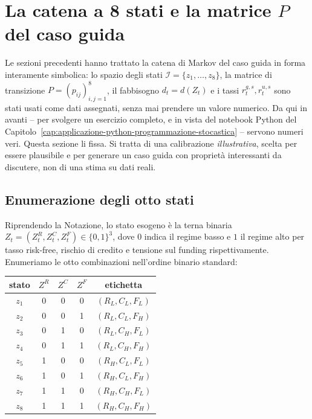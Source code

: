 \section{La catena a 8 stati e la matrice $P$ del caso guida}
\label{sec:cap15-catena-otto-stati}

Le sezioni precedenti hanno trattato la catena di Markov del caso guida
in forma interamente simbolica: lo spazio degli stati
$\mathcal I=\{z_1,\ldots,z_8\}$, la matrice di transizione
$P=(p_{ij})_{i,j=1}^{8}$, il fabbisogno $d_t=d(Z_t)$ e i tassi
$r_t^{g,s},r_t^{u,s}$ sono stati usati come dati assegnati, senza mai
prendere un valore numerico. Da qui in avanti -- per svolgere un esercizio
completo, e in vista del notebook Python del
Capitolo~\ref{cap:applicazione-python-programmazione-stocastica} -- servono
numeri veri. Questa sezione li fissa. Si tratta di una calibrazione
\emph{illustrativa}, scelta per essere plausibile e per generare un caso
guida con propriet\`a interessanti da discutere, non di una stima su dati
reali.

\subsection{Enumerazione degli otto stati}

Riprendendo la Notazione, lo stato esogeno \`e la terna binaria
$Z_t=(Z_t^R,Z_t^C,Z_t^F)\in\{0,1\}^3$, dove $0$ indica il regime basso e
$1$ il regime alto per tasso risk-free, rischio di credito e tensione sul
funding rispettivamente. Enumeriamo le otto combinazioni nell'ordine
binario standard:

\begin{center}
\begin{tabular}{c|ccc|c}
stato & $Z^R$ & $Z^C$ & $Z^F$ & etichetta \\
\hline
$z_1$ & 0 & 0 & 0 & $(R_L,C_L,F_L)$ \\
$z_2$ & 0 & 0 & 1 & $(R_L,C_L,F_H)$ \\
$z_3$ & 0 & 1 & 0 & $(R_L,C_H,F_L)$ \\
$z_4$ & 0 & 1 & 1 & $(R_L,C_H,F_H)$ \\
$z_5$ & 1 & 0 & 0 & $(R_H,C_L,F_L)$ \\
$z_6$ & 1 & 0 & 1 & $(R_H,C_L,F_H)$ \\
$z_7$ & 1 & 1 & 0 & $(R_H,C_H,F_L)$ \\
$z_8$ & 1 & 1 & 1 & $(R_H,C_H,F_H)$ \\
\end{tabular}
\end{center}

